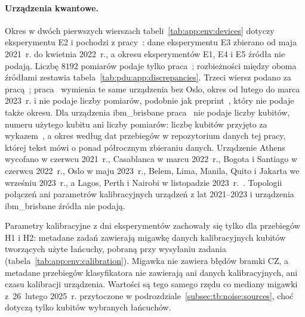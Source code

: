 \paragraph{Urządzenia kwantowe.}
Okres w dwóch pierwszych wierszach tabeli~\ref{tab:app:env:devices} dotyczy eksperymentu E2 i pochodzi z pracy~\cite{werner_magisterka_2022}: dane eksperymentu E3 zbierano od maja 2021~r. do kwietnia 2022~r., a okresu eksperymentów E1, E4 i E5 źródła nie podają.
Liczbę $8192$ pomiarów podaje tylko praca~\cite{werner_experiment_driven_2022}; rozbieżności między oboma źródłami zestawia tabela~\ref{tab:pdu:app:discrepancies}.
Trzeci wiersz podano za pracą~\cite{werner_data_loss_2023}; praca~\cite{werner_error_reduction_2025} wymienia te same urządzenia bez Oslo, okres od lutego do marca 2023~r. i nie podaje liczby pomiarów, podobnie jak preprint~\cite{werner_deep_learning_manuscript}, który nie podaje także okresu.
Dla urządzenia ibm\_brisbane praca~\cite{raubitzek_quantum_noise} nie podaje liczby kubitów, numeru użytego kubitu ani liczby pomiarów: liczbę kubitów przyjęto za wykazem~\cite{ibm_retired_qpus_2026}, a okres według dat przebiegów w repozytorium danych tej pracy, której tekst mówi o ponad półrocznym zbieraniu danych.
Urządzenie Athens wycofano w czerwcu 2021~r., Casablanca w marcu 2022~r., Bogota i Santiago w czerwcu 2022~r., Oslo w maju 2023~r., Belem, Lima, Manila, Quito i Jakarta we wrześniu 2023~r., a Lagos, Perth i Nairobi w listopadzie 2023~r.~\cite{ibm_retired_qpus_2026}.
Topologii połączeń ani parametrów kalibracyjnych urządzeń z lat 2021--2023 i urządzenia ibm\_brisbane źródła nie podają.

Parametry kalibracyjne z dni eksperymentów zachowały się tylko dla przebiegów H1 i H2: metadane zadań zawierają migawkę danych kalibracyjnych kubitów tworzących użyte łańcuchy, pobraną przy wysyłaniu zadania (tabela~\ref{tab:app:env:calibration}).
Migawka nie zawiera błędów bramki CZ, a metadane przebiegów klasyfikatora nie zawierają ani danych kalibracyjnych, ani czasu kalibracji urządzenia.
Wartości są tego samego rzędu co mediany migawki z~26~lutego 2025~r. przytoczone w podrozdziale~\ref{subsec:tb:noise:sources}, choć dotyczą tylko kubitów wybranych łańcuchów.

